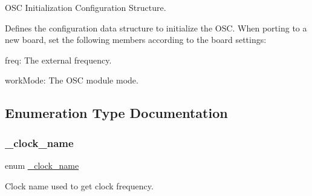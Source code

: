 O\+SC Initialization Configuration Structure. 

Defines the configuration data structure to initialize the O\+SC. When porting to a new board, set the following members according to the board settings\+:
\begin{DoxyEnumerate}
\item freq\+: The external frequency.
\item work\+Mode\+: The O\+SC module mode. 
\end{DoxyEnumerate}

\subsection{Enumeration Type Documentation}
\mbox{\label{group__clock_ga10eb499a97d1bd20020841220bb5de74}} 
\subsubsection{\texorpdfstring{\_clock\_name}{\_clock\_name}}
{\footnotesize\ttfamily enum \mbox{\hyperlink{group__clock_ga10eb499a97d1bd20020841220bb5de74}{\+\_\+clock\+\_\+name}}}



Clock name used to get clock frequency. 

